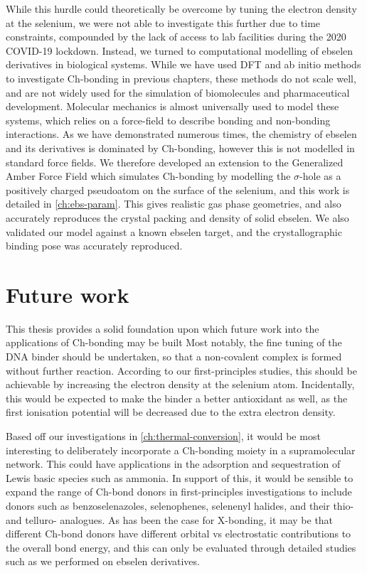 \begin{refsection}
While this hurdle could theoretically be overcome by tuning the electron density at the selenium, we were not able to investigate this further due to time constraints, compounded by the lack of access to lab facilities during the 2020 COVID-19 lockdown.
Instead, we turned to computational modelling of ebselen derivatives in biological systems.
While we have used DFT and ab initio methods to investigate Ch-bonding in previous chapters, these methods do not scale well, and are not widely used for the simulation of biomolecules and pharmaceutical development.
Molecular mechanics is almost universally used to model these systems, which relies on a force-field to describe bonding and non-bonding interactions.
As we have demonstrated numerous times, the chemistry of ebselen and its derivatives is dominated by Ch-bonding, however this is not modelled in standard force fields.
We therefore developed an extension to the Generalized Amber Force Field which simulates Ch-bonding by modelling the $\sigma$-hole as a positively charged pseudoatom on the surface of the selenium, and this work is detailed in \cref{ch:ebs-param}.
This gives realistic gas phase geometries, and also accurately reproduces the crystal packing and density of solid ebselen.
We also validated our model against a known ebselen target, and the crystallographic binding pose was accurately reproduced.

\section{Future work}
This thesis provides a solid foundation upon which future work into the applications of Ch-bonding may be built
Most notably, the fine tuning of the DNA binder should be undertaken, so that a non-covalent complex is formed without further reaction.
According to our first-principles studies, this should be achievable by increasing the electron density at the selenium atom.
Incidentally, this would be expected to make the binder a better antioxidant as well, as the first ionisation potential will be decreased due to the extra electron density.

Based off our investigations in \cref{ch:thermal-conversion}, it would be most interesting to deliberately incorporate a Ch-bonding moiety in a supramolecular network.
This could have applications in the adsorption and sequestration of Lewis basic species such as ammonia.
In support of this, it would be sensible to expand the range of Ch-bond donors in first-principles investigations to include donors such as benzoselenazoles, selenophenes, selenenyl halides, and their thio- and telluro- analogues. 
As has been the case for X-bonding, it may be that different Ch-bond donors have different orbital vs electrostatic contributions to the overall bond energy, and this can only be evaluated through detailed studies such as we performed on ebselen derivatives.


\end{refsection}
